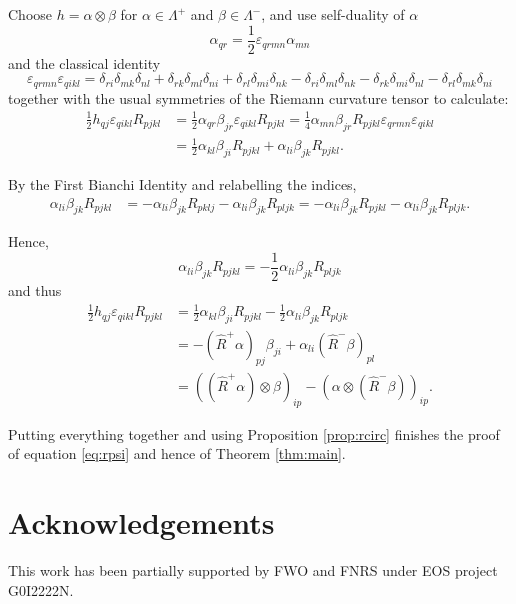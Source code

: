 \documentclass[oneside,12pt]{amsart}
\theoremstyle{definition}
\numberwithin{equation}{section}
\begin{document}
Choose $h = \alpha \otimes \beta$ for $\alpha \in \Lambda^+$ and $\beta \in \Lambda^-$, and use self-duality of $\alpha$  
\[
\alpha_{qr} = \frac{1}{2} \varepsilon_{qrmn} \alpha_{mn}
\]
and the classical identity 
\[
\varepsilon_{qrmn} \varepsilon_{qikl} = \delta_{ri}\delta_{mk}\delta_{nl}+\delta_{rk}\delta_{ml}\delta_{ni}+\delta_{rl}\delta_{mi}\delta_{nk} - \delta_{ri}\delta_{ml}\delta_{nk}-\delta_{rk}\delta_{mi}\delta_{nl}
-\delta_{rl}\delta_{mk}\delta_{ni}
\]
together with the usual symmetries of the Riemann curvature tensor to calculate: 
\begin{align*}
    \frac{1}{2} h_{qj} \varepsilon_{qikl} R_{pjkl} &= \frac{1}{2} \alpha_{qr} \beta_{jr} \varepsilon_{qikl} R_{pjkl} = \frac{1}{4} \alpha_{mn} \beta_{jr} R_{pjkl} \varepsilon_{qrmn} \varepsilon_{qikl} \\
    &= \frac{1}{2} \alpha_{kl} \beta_{ji} R_{pjkl} + \alpha_{li} \beta_{jk} R_{pjkl} . 
\end{align*}

By the First Bianchi Identity and relabelling the indices, 
\begin{align*}
    \alpha_{li} \beta_{jk} R_{pjkl} &= - \alpha_{li} \beta_{jk} R_{pklj} - \alpha_{li} \beta_{jk} R_{pljk} = - \alpha_{li} \beta_{jk} R_{pjkl} - \alpha_{li} \beta_{jk} R_{pljk} . 
\end{align*}

Hence, 
\[
\alpha_{li} \beta_{jk} R_{pjkl} = - \frac{1}{2} \alpha_{li} \beta_{jk} R_{pljk}
\]
and thus 
\begin{align*}
\frac{1}{2} h_{qj} \varepsilon_{qikl} R_{pjkl} &= \frac{1}{2} \alpha_{kl} \beta_{ji} R_{pjkl} - \frac{1}{2} \alpha_{li} \beta_{jk} R_{pljk} \\
&= -(\widehat{R}^+ \alpha)_{pj} \beta_{ji} + \alpha_{li} (\widehat{R}^- \beta)_{pl} \\
&= ((\widehat{R}^+ \alpha) \otimes \beta)_{ip} - (\alpha \otimes (\widehat{R}^- \beta))_{ip} . 
\end{align*}

Putting everything together and using Proposition \ref{prop:rcirc} finishes the proof of equation \eqref{eq:rpsi} and hence of Theorem \ref{thm:main}. 

\section*{Acknowledgements}

 This work has been partially supported by FWO and FNRS under EOS project G0I2222N.



\end{document}
